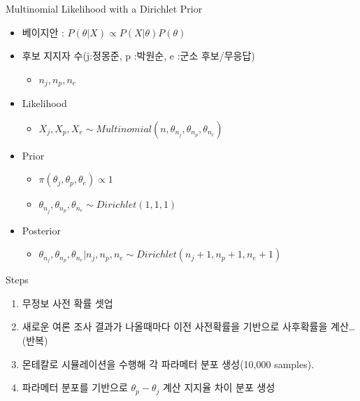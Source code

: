 \documentclass[ignorenonframetext,]{beamer}
\begin{document}
\begin{frame}{Multinomial Likelihood with a Dirichlet Prior}

\begin{itemize}
\itemsep1pt\parskip0pt
\item
  베이지안 : $P(\theta|X) \propto P(X|\theta)P(\theta)$
\item
  후보 지지자 수(j:정몽준, p :박원순, e :군소 후보/무응답)

  \begin{itemize}
  \itemsep1pt\parskip0pt
  \item
    $n_j, n_p, n_e$
  \end{itemize}
\item
  Likelihood

  \begin{itemize}
  \itemsep1pt\parskip0pt
  \item
    $X_j,X_p,X_e \sim Multinomial(n, \theta_{n_j}, \theta_{n_p}, \theta_{n_e})$
  \end{itemize}
\item
  Prior

  \begin{itemize}
  \itemsep1pt\parskip0pt
  \item
    $\pi(\theta_j, \theta_p, \theta_e) \propto 1$
  \item
    $\theta_{n_j}, \theta_{n_p}, \theta_{n_e} \sim Dirichlet(1,1,1)$
  \end{itemize}
\item
  Posterior

  \begin{itemize}
  \itemsep1pt\parskip0pt
  \item
    $\theta_{n_j}, \theta_{n_p}, \theta_{n_e}|n_j,n_p,n_e \sim Dirichlet(n_j + 1, n_p + 1, n_e + 1)$
  \end{itemize}
\end{itemize}

\end{frame}

\begin{frame}{Steps}

\begin{enumerate}
\def\labelenumi{\arabic{enumi}.}
\itemsep1pt\parskip0pt
\item
  무정보 사전 확률 셋업
\item
  새로운 여론 조사 결과가 나올때마다 이전 사전확률을 기반으로 사후확률을
  계산\ldots{}(반복)
\item
  몬테칼로 시뮬레이션을 수행해 각 파라메터 분포 생성(10,000 samples).
\item
  파라메터 분포를 기반으로 $\theta_p - \theta_j$ 계산 지지율 차이 분포
  생성
\end{enumerate}

\end{frame}
\end{document}
